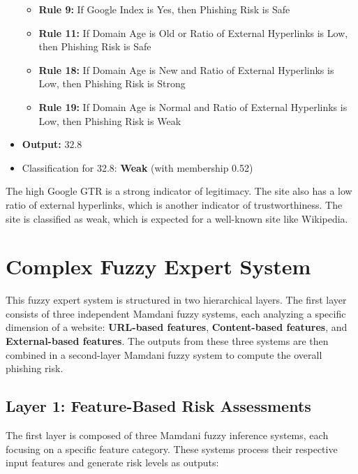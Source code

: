 \documentclass[11pt]{article}
\begin{document}
\begin{itemize}
\begin{itemize}
        \item \textbf{Rule 9:} If Google Index is Yes, then Phishing Risk is Safe
        \item \textbf{Rule 11:} If Domain Age is Old or Ratio of External Hyperlinks is Low, then Phishing Risk is Safe
        \item \textbf{Rule 18:} If Domain Age is New and Ratio of External Hyperlinks is Low, then Phishing Risk is Strong
        \item \textbf{Rule 19:} If Domain Age is Normal and Ratio of External Hyperlinks is Low, then Phishing Risk is Weak
    \end{itemize}
    \item \textbf{Output:} $32.8$
    \item Classification for 32.8: \textbf{Weak} (with membership 0.52)
\end{itemize}

The high Google GTR is a strong indicator of legitimacy. The site also has a low ratio of external hyperlinks, which is another indicator of trustworthiness. The site is classified as weak, which is expected for a well-known site like Wikipedia.

\section{Complex Fuzzy Expert System}

This fuzzy expert system is structured in two hierarchical layers. The first layer consists of three independent Mamdani fuzzy systems, each analyzing a specific dimension of a website: \textbf{URL-based features}, \textbf{Content-based features}, and \textbf{External-based features}. The outputs from these three systems are then combined in a second-layer Mamdani fuzzy system to compute the overall phishing risk.

\subsection{Layer 1: Feature-Based Risk Assessments}

The first layer is composed of three Mamdani fuzzy inference systems, each focusing on a specific feature category. These systems process their respective input features and generate risk levels as outputs:
\end{document}
